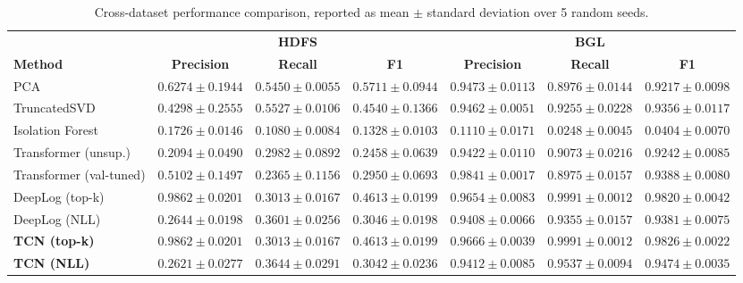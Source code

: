 \documentclass[conference]{IEEEtran}
\begin{document}
\begin{table}[!t]
\caption{Cross-dataset performance comparison, reported as mean $\pm$ standard deviation over 5 random seeds.}
\centering
\scriptsize
\setlength{\tabcolsep}{3pt}
\begin{tabular}{l ccc ccc}
\toprule
& \multicolumn{3}{c}{\textbf{HDFS}} & \multicolumn{3}{c}{\textbf{BGL}} \\
\cmidrule(lr){2-4} \cmidrule(lr){5-7}
\textbf{Method} & \textbf{Precision} & \textbf{Recall} & \textbf{F1} & \textbf{Precision} & \textbf{Recall} & \textbf{F1} \\
\midrule
PCA & $0.6274 \pm 0.1944$ & $0.5450 \pm 0.0055$ & $0.5711 \pm 0.0944$ & $0.9473 \pm 0.0113$ & $0.8976 \pm 0.0144$ & $0.9217 \pm 0.0098$ \\
TruncatedSVD & $0.4298 \pm 0.2555$ & $0.5527 \pm 0.0106$ & $0.4540 \pm 0.1366$ & $0.9462 \pm 0.0051$ & $0.9255 \pm 0.0228$ & $0.9356 \pm 0.0117$ \\
Isolation Forest & $0.1726 \pm 0.0146$ & $0.1080 \pm 0.0084$ & $0.1328 \pm 0.0103$ & $0.1110 \pm 0.0171$ & $0.0248 \pm 0.0045$ & $0.0404 \pm 0.0070$ \\
\midrule
Transformer (unsup.) & $0.2094 \pm 0.0490$ & $0.2982 \pm 0.0892$ & $0.2458 \pm 0.0639$ & $0.9422 \pm 0.0110$ & $0.9073 \pm 0.0216$ & $0.9242 \pm 0.0085$ \\
Transformer (val-tuned) & $0.5102 \pm 0.1497$ & $0.2365 \pm 0.1156$ & $0.2950 \pm 0.0693$ & $0.9841 \pm 0.0017$ & $0.8975 \pm 0.0157$ & $0.9388 \pm 0.0080$ \\
DeepLog (top-k) & $0.9862 \pm 0.0201$ & $0.3013 \pm 0.0167$ & $0.4613 \pm 0.0199$ & $0.9654 \pm 0.0083$ & $\mathbf{0.9991 \pm 0.0012}$ & $0.9820 \pm 0.0042$ \\
DeepLog (NLL) & $0.2644 \pm 0.0198$ & $0.3601 \pm 0.0256$ & $0.3046 \pm 0.0198$ & $0.9408 \pm 0.0066$ & $0.9355 \pm 0.0157$ & $0.9381 \pm 0.0075$ \\
\midrule
\textbf{TCN (top-k)} & $0.9862 \pm 0.0201$ & $0.3013 \pm 0.0167$ & $0.4613 \pm 0.0199$ & $\mathbf{0.9666 \pm 0.0039}$ & $\mathbf{0.9991 \pm 0.0012}$ & $\mathbf{0.9826 \pm 0.0022}$ \\
\textbf{TCN (NLL)} & $0.2621 \pm 0.0277$ & $0.3644 \pm 0.0291$ & $0.3042 \pm 0.0236$ & $0.9412 \pm 0.0085$ & $0.9537 \pm 0.0094$ & $\mathbf{0.9474 \pm 0.0035}$ \\
\bottomrule
\end{tabular}
\label{tab_cross_dataset}
\end{table}
\end{document}
